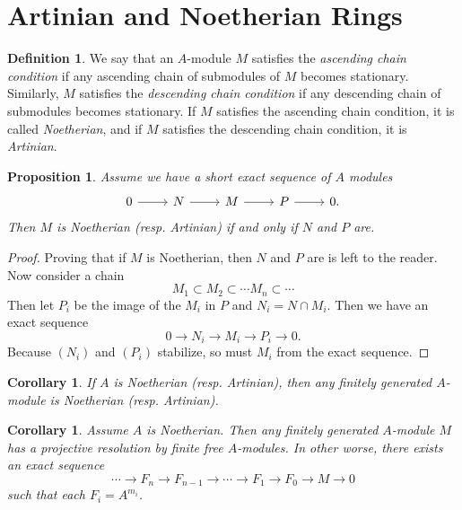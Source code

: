\documentclass[leqno, openany]{memoir}
\newtheorem{cor}[thm]{Corollary}
\newtheorem{prop}[thm]{Proposition}
\theoremstyle{definition}
\newtheorem{defn}[thm]{Definition}
\theoremstyle{remark}
\theoremstyle{plain}
\theoremstyle{definition}
\theoremstyle{remark}
\begin{document}
\section{Artinian and Noetherian Rings}%
\label{sec:artinian_and_noetherian_rings}

\begin{defn}
    We say that an $A$-module $M$ satisfies the \textit{ascending chain condition} if any ascending chain of submodules of $M$ becomes stationary. Similarly, $M$ satisfies the \textit{descending chain condition} if any descending chain of submodules becomes stationary. If $M$ satisfies the ascending chain condition, it is called \textit{Noetherian}, and if $M$ satisfies the descending chain condition, it is \textit{Artinian}.
\end{defn}

\begin{prop}
    Assume we have a short exact sequence of $A$ modules
    \begin{equation}
    \begin{tikzcd}
        0 \arrow{r} & N \arrow{r} & M \arrow{r} & P \arrow{r} & 0.
    \end{tikzcd}
    \end{equation}
    Then $M$ is Noetherian (resp. Artinian) if and only if $N$ and $P$ are.
\end{prop}

\begin{proof}
    Proving that if $M$ is Noetherian, then $N$ and $P$ are is left to the reader. Now consider a chain
    \[ M_1 \subset M_2 \subset \cdots M_n \subset \cdots \]
    Then let $P_i$ be the image of the $M_i$ in $P$ and $N_i = N \cap M_i$. Then we have an exact sequence
    \[ 0 \to N_i \to M_i \to P_i \to 0. \]
    Because $(N_i)$ and $(P_i)$ stabilize, so must $M_i$ from the exact sequence.
\end{proof}

\begin{cor}
    If $A$ is Noetherian (resp. Artinian), then any finitely generated $A$-module is Noetherian (resp. Artinian).
\end{cor}

\begin{cor}
    Assume $A$ is Noetherian. Then any finitely generated $A$-module $M$ has a projective resolution by finite free $A$-modules. In other worse, there exists an exact sequence 
    \[ \cdots \to F_n \to F_{n-1} \to \cdots \to F_1 \to F_0 \to M \to 0 \]
    such that each $F_i = A^{m_i}$.
\end{cor}
\end{document}
